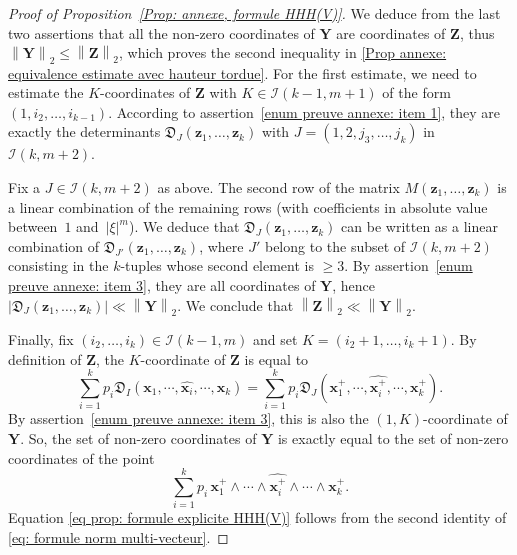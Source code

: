 \documentclass[JEP,XML,SOM,Unicode,NoFloatCountersInSection,published]{cedram}
\newcommand\bx{\boldsymbol{x}}
\newcommand\bz{\boldsymbol{z}}
\newcommand\bY{\boldsymbol{Y}}
\newcommand\bZZ{\boldsymbol{Z}}
\newcommand\cD{\mathfrak{D}}
\newcommand\cI{\mathcal{I}}
\newcommand{\norm}[1]{\left\|#1 \right\|_2}
\theoremstyle{definition}
\theoremstyle{plain}
\begin{document}
\begin{proof}[Proof of Proposition~\ref{Prop: annexe, formule HHH(V)}]
We deduce from the last two assertions that all the non-zero coordinates of $\bY$ are coordinates of $\bZZ$, thus $\norm{\bY} \leq \norm{\bZZ}$, which proves the second inequality in \eqref{Prop annexe: equivalence estimate avec hauteur tordue}. For the first estimate, we need to estimate the $K$-coordinates of $\bZZ$ with $K\in\cI(k-1,m+1)$ of the form $(1,i_2,\dots,i_{k-1})$. According to assertion~\eqref{enum preuve annexe: item 1}, they are exactly the determinants $\cD_J(\bz_1,\dots,\bz_k)$ with $J = (1,2,j_3,\dots,j_k)$ in $\cI(k,m+2)$.

Fix a $J\in \cI(k,m+2)$ as above. The second row of the matrix $M(\bz_1,\dots,\bz_k)$ is a linear combination of the remaining rows (with coefficients in absolute value between~$1$ and~$|\xi|^m$). We deduce that $\cD_J(\bz_1,\dots,\bz_k)$ can be written as a linear combination of $\cD_{J'}(\bz_1,\dots,\bz_k)$, where $J'$ belong to the subset of $\cI(k,m+2)$ consisting in the $k$-tuples whose second element is $\geq 3$. By assertion~\eqref{enum preuve annexe: item 3}, they are all coordinates of $\bY$, hence $|\cD_J(\bz_1,\dots,\bz_k)|\ll \norm{\bY}$. We conclude that $\norm{\bZZ}\ll \norm{\bY}$.

Finally, fix $(i_2,\dots,i_k)\in\cI(k-1,m)$ and set $K = (i_2+1,\dots,i_k+1)$. By definition of $\bZZ$, the $K$-coordinate of $\bZZ$ is equal to
\begin{equation*}
\sum_{i=1}^{k}p_i \cD_I(\bx_1,\cdots,\widehat{\bx_i}, \cdots,\bx_k) = \sum_{i=1}^{k}p_i \cD_J(\bx_1^+,\cdots,\widehat{\bx_i^+}, \cdots,\bx_k^+).
\end{equation*}
By assertion~\eqref{enum preuve annexe: item 3}, this is also the $(1,K)$-coordinate of $\bY$. So, the set of non-zero coordinates of $\bY$ is exactly equal to the set of non-zero coordinates of the point
\[
\sum_{i=1}^{k}p_i\,\bx_1^+\wedge \cdots \wedge\widehat{\bx_i^+}\wedge \cdots \wedge\bx_k^+.
\]
Equation \eqref{eq prop: formule explicite HHH(V)} follows from the second identity of \eqref{eq: formule norm multi-vecteur}.
\end{proof}

\backmatter


\end{document}
